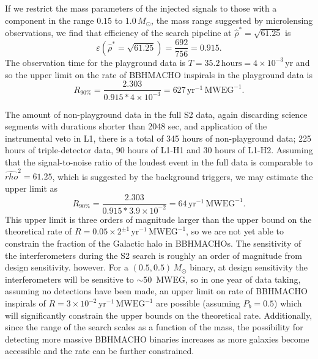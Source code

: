 If we restrict the mass parameters of the injected signals to those with a
component in the range $0.15$ to $1.0\,M_\odot$, the mass range suggested by
microlensing observations, we find that efficiency of the search pipeline at
$\hat{\rho}^\ast = \sqrt{61.25}$ is 
\begin{equation}
\varepsilon\left( \hat{\rho}^\ast = \sqrt{61.25} \right) = \frac{ 692 } { 756
} = 0.915.
\end{equation}
The observation time for the playground data is $T = 35.2\,\mathrm{hours} = 4
\times 10^{-3}\,\mathrm{yr}$ and so the upper limit on the rate of BBHMACHO
inspirals in the playground data is
\begin{equation}
R_{90\%} = \frac{2.303}{0.915 * 4 \times 10^{-3}} = 
627\,\mathrm{yr}^{-1}\,\mathrm{MWEG}^{-1}.
\end{equation}

The amount of non-playground data in the full S2 data, again discarding
science segments with durations shorter than 2048 sec,  and application of the
instrumental veto in L1, there is a total of 345 hours of non-playground data;
225 hours of triple-detector data, 90 hours of L1-H1 and 30 hours of L1-H2.
Assuming that the signal-to-noise ratio of the loudest event in the full data
is comparable to $\hat{rho}^2 = 61.25$, which is suggested by the background
triggers, we may estimate the upper limit as
\begin{equation}
R_{90\%} = \frac{2.303}{0.915 * 3.9 \times 10^{-2}} = 
64\,\mathrm{yr}^{-1}\,\mathrm{MWEG}^{-1}.
\end{equation}
This upper limit is three orders of magnitude larger than the upper bound on
the theoretical rate of $R = 0.05\times2^{\pm
1}\,\mathrm{yr}^{-1}\,\mathrm{MWEG}^{-1}$, so we are not yet able to constrain
the fraction of the Galactic halo in BBHMACHOs. The sensitivity of the
interferometers during the S2 search is roughly an order of magnitude from
design sensitivity. however. For a $(0.5,0.5)\,M_\odot$ binary, at design
sensitivity the interferometers will be sensitive to $\sim 50$~MWEG, so in one
year of data taking, assuming no detections have been made, an upper limit on
rate of BBHMACHO inspirals of $R =
3\times10^{-2}\,\mathrm{yr}^{-1}\,\mathrm{MWEG}^{-1}$ are possible (assuming
$P_b = 0.5$) which will significantly constrain the upper bounds on the
theoretical rate. Additionally, since the range of the search scales as a
function of the mass, the possibility for detecting more massive BBHMACHO
binaries increases as more galaxies become accessible and the rate can be
further constrained.

